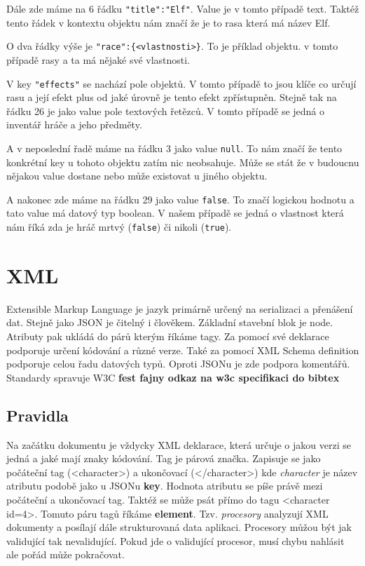 Dále zde máme na 6 řádku \verb|"title":"Elf"|. Value je v tomto případě text. Taktéž tento řádek v kontextu objektu nám značí že je to rasa která má název Elf.

O dva řádky výše je \verb|"race":{<vlastnosti>}|. To je příklad objektu. v tomto případě rasy a ta má nějaké své vlastnosti.

V key \texttt{"effects"} se nachází pole objektů. V tomto případě to jsou klíče co určují rasu a její efekt plus od jaké úrovně je tento efekt zpřístupněn. Stejně tak na řádku 26 je jako value pole textových řetězců. V tomto případě se jedná o inventář hráče a jeho předměty.

A v neposlední řadě máme na řádku 3 jako value \texttt{null}. To nám značí že tento konkrétní key u tohoto objektu zatím nic neobsahuje. Může se stát že v budoucnu nějakou value dostane nebo může existovat u jiného objektu.

A nakonec zde máme na řádku 29 jako value \texttt{false}. To značí logickou hodnotu a tato value má datový typ boolean. V našem případě se jedná o vlastnost která nám říká zda je hráč mrtvý (\texttt{false}) či nikoli (\texttt{true}).


\section{XML}
Extensible Markup Language je jazyk primárně určený na serializaci a přenášení dat. Stejně jako JSON je čitelný i člověkem. Základní stavební blok je node. Atributy pak ukládá do párů kterým říkáme tagy. Za pomocí své deklarace podporuje určení kódování a různé verze. Také za pomocí XML Schema definition podporuje celou řadu datových typů. Oproti JSONu je zde podpora komentářů. Standardy spravuje W3C \textbf{fest fajny odkaz na w3c specifikaci do bibtex} %


\subsection{Pravidla}
Na začátku dokumentu je vždycky XML deklarace, která určuje o jakou verzi se jedná a jaké mají znaky kódování.
Tag je párová značka. Zapisuje se jako počáteční tag (<character>) a ukončovací (</character>) kde \textit{character} je název atributu podobě jako u JSONu \textbf{key}. Hodnota atributu se píše právě mezi počáteční a ukončovací tag. Taktéž se může psát přímo do tagu <character id=4>. Tomuto páru tagů říkáme \textbf{element}. Tzv. \textit{procesory} analyzují XML dokumenty a posílají dále strukturovaná data aplikaci. Procesory můžou být jak validující tak nevalidující. Pokud jde o validující procesor, musí chybu nahlásit ale pořád může pokračovat.



